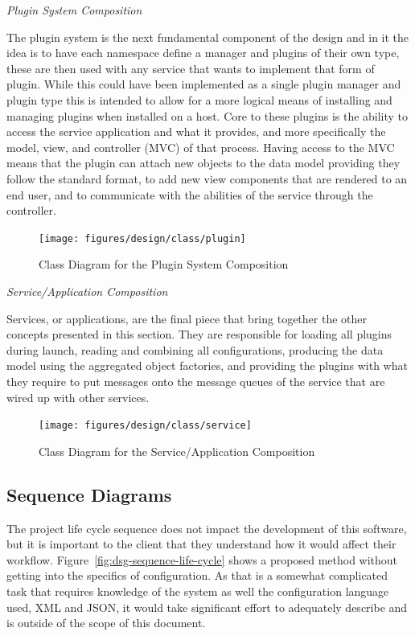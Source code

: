    \emph{Plugin System Composition}

    The plugin system is the next fundamental component of the design and in
    it the idea is to have each namespace define a manager and plugins of their
    own type, these are then used with any service that wants to implement that
    form of plugin. While this could have been implemented as a single plugin
    manager and plugin type this is intended to allow for a more logical means
    of installing and managing plugins when installed on a host. Core to these
    plugins is the ability to access the service application and what it
    provides, and more specifically the model, view, and controller (MVC) of
    that process. Having access to the MVC means that the plugin can attach new
    objects to the data model providing they follow the standard format, to add
    new view components that are rendered to an end user, and to communicate
    with the abilities of the service through the controller.

    \begin{figure}[H]
      \texttt{[image: figures/design/class/plugin]}
      \caption{Class Diagram for the Plugin System Composition}
      \label{fig:dsg-class-plugin}
    \end{figure}

    \emph{Service/Application Composition}

    Services, or applications, are the final piece that bring together the
    other concepts presented in this section. They are responsible for loading
    all plugins during launch, reading and combining all configurations,
    producing the data model using the aggregated object factories, and
    providing the plugins with what they require to put messages onto the
    message queues of the service that are wired up with other services.

    \begin{figure}[H]
        \texttt{[image: figures/design/class/service]}
      \caption{Class Diagram for the Service/Application Composition}
      \label{fig:dsg-class-service}
    \end{figure}

  \subsection{Sequence Diagrams}\label{sec:dsg-sequence}

    The project life cycle sequence does not impact the development of this
    software, but it is important to the client that they understand how it
    would affect their workflow. Figure~\ref{fig:dsg-sequence-life-cycle} shows
    a proposed method without getting into the specifics of configuration. As
    that is a somewhat complicated task that requires knowledge of the system as
    well the configuration language used, XML and JSON, it would take
    significant effort to adequately describe and is outside of the scope of
    this document.

